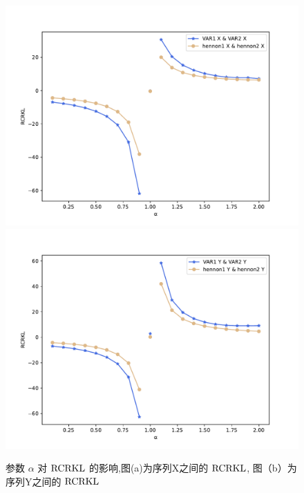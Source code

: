 \begin{figure}[htbp]
\begin{center}
\includegraphics[scale=0.35]{./ch2/fig2_1.pdf}\label{a}
\includegraphics[scale=0.35]{./ch2/fig2_2.pdf}\label{b}
\caption{参数 $\alpha$ 对 $\rm{RCRKL}$ 的影响,图(a)为序列X之间的 $\rm{RCRKL}$, 图（b）为序列Y之间的 $\rm{RCRKL}$} \label{fig1}
\end{center}
\end{figure}\label{x_x_var}

